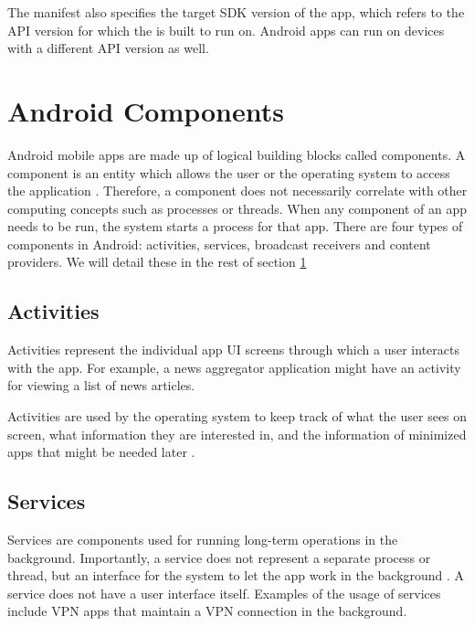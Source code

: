     The manifest also specifies the target SDK version of the app, which refers to the API version for which the is built to run on. Android apps can run on devices with a different API version as well.
    
    \section{Android Components}
        \label{sec:android_components}
        
    Android mobile apps are made up of logical building blocks called components. A component is an entity which allows the user or the operating system to access the application \cite{android_app_fundamentals}. Therefore, a component does not necessarily correlate with other computing concepts such as processes or threads. When any component of an app needs to be run, the system starts a process for that app. There are four types of components in Android: activities, services, broadcast receivers and content providers. We will detail these in the rest of section \ref{sec:android_components}
    
    \subsection{Activities}
        \label{subsec:activities}
        
    Activities represent the individual app UI screens through which a user interacts with the app. For example, a news aggregator application might have an activity for viewing a list of news articles.
    
    Activities are used by the operating system to keep track of what the user sees on screen, what information they are interested in, and the information of minimized apps that might be needed later \cite{android_app_fundamentals}.
    
    \subsection{Services}
        \label{subsec:services}
        
    Services are components used for running long-term operations in the background. Importantly, a service does not represent a separate process or thread, but an interface for the system to let the app work in the background \cite{whats_is_a_service}. A service does not have a user interface itself. Examples of the usage of services include VPN apps that maintain a VPN connection in the background.
    
